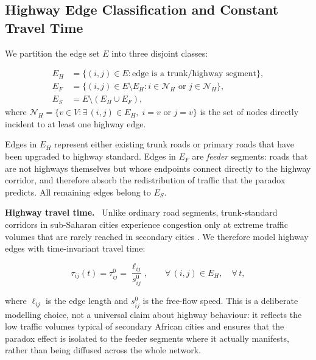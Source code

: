 \subsection{Highway Edge Classification and Constant Travel Time}
\label{subsec:hw_classification}

We partition the edge set $E$ into three disjoint classes:

\begin{definition}
\label{def:edge_class}
\begin{align}
  E_H &= \{ (i,j) \in E : \text{edge is a trunk/highway segment} \},
                                                         \label{eq:EH}\\
  E_F &= \{ (i,j) \in E\setminus E_H :
           i \in \mathcal{N}_H \text{ or } j \in \mathcal{N}_H \},
                                                         \label{eq:EF}\\
  E_S &= E \setminus (E_H \cup E_F),                    \label{eq:ES}
\end{align}
where $\mathcal{N}_H = \bigl\{ v \in V : \exists\,(i,j)\in E_H,\;
i=v \text{ or } j=v \bigr\}$ is the set of nodes directly incident to
at least one highway edge.
\end{definition}

Edges in $E_H$ represent either existing trunk roads or primary roads
that have been upgraded to highway standard. Edges in $E_F$ are
\textit{feeder} segments: roads that are not highways themselves but
whose endpoints connect directly to the highway corridor, and therefore
absorb the redistribution of traffic that the paradox predicts. All
remaining edges belong to $E_S$.

\textbf{Highway travel time.}~
Unlike ordinary road segments, trunk-standard corridors in sub-Saharan
cities experience congestion only at extreme traffic volumes that are
rarely reached in secondary cities \cite{gonzalez2023}. We therefore
model highway edges with time-invariant travel time:

\begin{equation}
  \tau_{ij}(t) = \tau_{ij}^{0}
  = \frac{\ell_{ij}}{s_{ij}^{0}}, \qquad \forall\,(i,j)\in E_H,
  \quad \forall\, t,
  \label{eq:hw_const}
\end{equation}

where $\ell_{ij}$ is the edge length and $s_{ij}^{0}$ is the free-flow
speed. This is a deliberate modelling choice, not a universal claim about
highway behaviour: it reflects the low traffic volumes typical of
secondary African cities and ensures that the paradox effect is isolated
to the feeder segments where it actually manifests, rather than being
diffused across the whole network.

